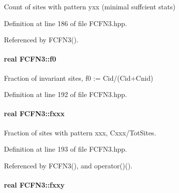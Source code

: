 \-Count of sites with pattern yxx (minimal suffcient stats) 



\-Definition at line 186 of file \-F\-C\-F\-N3.\-hpp.



\-Referenced by \-F\-C\-F\-N3().

\hypertarget{classFCFN3_a7555e90b5424a3989f51e1afbb76a36e}{
\paragraph[{f0}]{\setlength{\rightskip}{0pt plus 5cm}real {\bf \-F\-C\-F\-N3\-::f0}}}\label{classFCFN3_a7555e90b5424a3989f51e1afbb76a36e}


\-Fraction of invariant sites, f0 \-:= \-Cid/(\-Cid+\-Cnid) 



\-Definition at line 192 of file \-F\-C\-F\-N3.\-hpp.

\hypertarget{classFCFN3_ae3655e04a444781c13aac711f1672785}{
\paragraph[{fxxx}]{\setlength{\rightskip}{0pt plus 5cm}real {\bf \-F\-C\-F\-N3\-::fxxx}}}\label{classFCFN3_ae3655e04a444781c13aac711f1672785}


\-Fraction of sites with pattern xxx, \-Cxxx/\-Tot\-Sites. 



\-Definition at line 193 of file \-F\-C\-F\-N3.\-hpp.



\-Referenced by \-F\-C\-F\-N3(), and operator()().

\hypertarget{classFCFN3_a28619051be14083932e8c9f8018543d5}{
\paragraph[{fxxy}]{\setlength{\rightskip}{0pt plus 5cm}real {\bf \-F\-C\-F\-N3\-::fxxy}}}\label{classFCFN3_a28619051be14083932e8c9f8018543d5}


